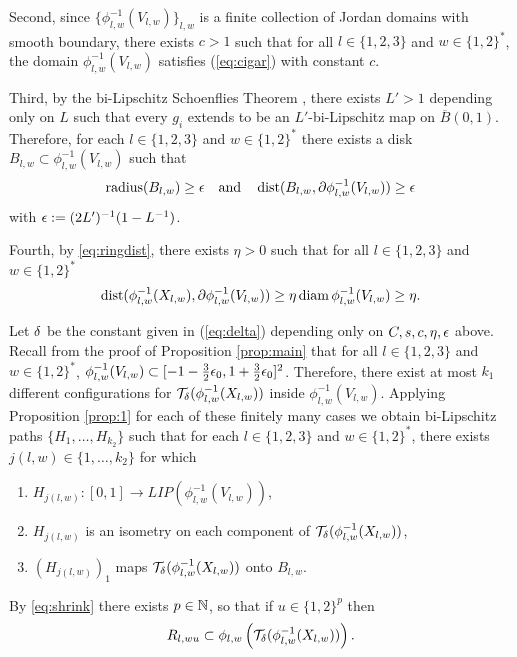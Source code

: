 \documentclass{amsart}
\DeclareMathOperator{\dist}{dist}
\begin{document}
Second, since $\{\phi^{-1}_{l,w}(V_{l,w})\}_{l,w}$ is a finite collection of Jordan domains with smooth boundary, there exists $c>1$ such that for all $ l\in\{1,2,3\}$ and $w \in\{1,2\}^*$, the domain $\phi^{-1}_{l,w}(V_{l,w})$ satisfies (\ref{eq:cigar}) with constant $c$. 

Third, by the bi-Lipschitz Schoenflies Theorem \cite[Theorem A]{TukiaBL}, there exists $L'>1$ depending only on $L$ such that every $g_i$ extends to be an $L'$-bi-Lipschitz map on $\overline{B}(0,1)$. Therefore, for each  $ l\in\{1,2,3\}$ and $w \in\{1,2\}^*$ there exists a disk $B_{l,w} \subset \phi^{-1}_{l,w}(V_{l,w})$ such that 
\[ \text{radius}(B_{l,w}) \geq \e \quad\text{and}\quad \dist(B_{l,w} , \partial \phi_{l,w}^{-1}(V_{l,w})) \geq \e \]
with $\epsilon:= (2L')^{-1}(1-L^{-1})$.

Fourth, by \eqref{eq:ringdist}, there exists $\eta>0$ such that for all $l\in\{1,2,3\}$ and $w\in\{1,2\}^*$
\[ \dist (\phi_{l,w}^{-1}(X_{l,w}) , \partial \phi_{l,w}^{-1}(V_{l,w})) \geq  \eta \diam{ \phi_{l,w}^{-1}(V_{l,w}) } \geq \eta .\]

Let $\delta$ be the constant given in (\ref{eq:delta}) depending only on $C,s,c,\eta,\epsilon$ above.
Recall from the proof of Proposition \ref{prop:main} that for all $ l\in\{1,2,3\}$ and $w \in\{1,2\}^*$, $\phi_{l,w}^{-1}(V_{l,w})\subset [-1-\frac32\epsilon_0,1+\frac32\epsilon_0]^2$. Therefore, there exist at most $k_1$ different configurations for $\mathcal{T}_{\delta}(\phi^{-1}_{l,w}(X_{l,w}))$ inside $\phi^{-1}_{l,w}(V_{l,w})$. Applying Proposition \ref{prop:1} for each of these finitely many cases we obtain bi-Lipschitz paths $\{H_1,\dots,H_{k_2}\}$ such that for each $l\in\{1,2,3\}$ and $w\in\{1,2\}^*$, there exists $j(l,w) \in\{1,\dots,k_2\}$ for which
\begin{enumerate}
\item $H_{j(l,w)}:[0,1] \to LIP(\phi_{l,w}^{-1}(V_{l,w}))$,
\item $H_{j(l,w)}$ is an isometry on each component of $\mathcal{T}_{\delta}(\phi^{-1}_{l,w}(X_{l,w}))$,
\item $(H_{j(l,w)})_1$ maps $\mathcal{T}_{\delta}(\phi^{-1}_{l,w}(X_{l,w}))$ onto $B_{l,w}$.
\end{enumerate}

By \eqref{eq:shrink}  there exists $p\in \mathbb{N}$, so that if $u\in \{1,2 \}^p$ then
\begin{equation*}
 R_{l,wu} \subset \phi_{l,w}\left(\mathcal{T}_{\delta}(\phi^{-1}_{l,w}(X_{l,w})) \right).
\end{equation*}
\end{document}
